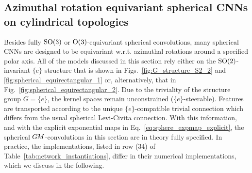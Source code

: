 

\subsection{Azimuthal rotation equivariant spherical CNNs on cylindrical topologies}
\label{sec:spherical_CNNs_azimuthal_equivariant}



Besides fully $\operatorname{SO}(3)$ or $\operatorname{O}(3)$-equivariant spherical convolutions, many spherical CNNs are designed to be equivariant w.r.t. azimuthal rotations around a specified polar axis.
All of the models discussed in this section rely either on the $\operatorname{SO}(2)$-invariant $\{e\}$-structure
that is shown in Figs.~\ref{fig:G_structure_S2_2} and \ref{fig:spherical_equirectangular_1}
or, alternatively, that in Fig.~\ref{fig:spherical_equirectangular_2}.
Due to the triviality of the structure group $G=\{e\}$, the kernel spaces remain unconstrained ($\{e\}$-steerable).
Features are transported according to the unique $\{e\}$-compatible trivial connection which differs from the usual spherical Levi-Civita connection.
With this information, and with the explicit exponential maps in Eq.~\eqref{eq:sphere_expmap_explicit}, the spherical $G\mkern-1.4muM$-convolutions in this section are in theory fully specified.
In practice, the implementations, listed in row (34) of Table~\ref{tab:network_instantiations}, differ in their numerical implementations, which we discuss in the following.


